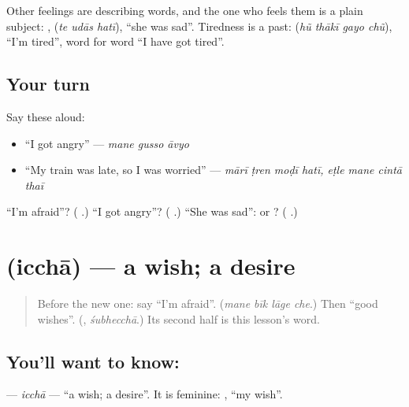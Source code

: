 Other feelings are describing words, and the one who feels them is a plain subject: \textbf{  }, \textbf{  } (\emph{te udās hatī}), \textquotedblleft{}she was sad\textquotedblright{}. Tiredness is a past: \textbf{   } (\emph{hũ thākī gayo chũ}), \textquotedblleft{}I'm tired\textquotedblright{}, word for word \textquotedblleft{}I have got tired\textquotedblright{}.

\subsection*{Your turn}
Say these aloud:

\begin{itemize}
\raggedright
  \item \textquotedblleft{}I got angry\textquotedblright{} — \emph{mane gusso āvyo}
  \item \textquotedblleft{}My train was late, so I was worried\textquotedblright{} — \emph{mārī ṭren moḍī hatī, eṭle mane cintā thaī}
\end{itemize}

\begin{tcolorbox}[breakable,colback=teal!4,colframe=teal!35!black,title={Before you move on}]
\textquotedblleft{}I'm afraid\textquotedblright{}? (\textbf{   }.) \textquotedblleft{}I got angry\textquotedblright{}? (\textbf{  }.) \textquotedblleft{}She was sad\textquotedblright{}: \textbf{} or \textbf{}? (\textbf{  }.)
\end{tcolorbox}
\section[\texorpdfstring{\gu{ઇચ્છા} (icchā)}{ઇચ્છા (icchā)}]{ (icchā) — a wish; a desire}

\label{lesson:GU-C281-iccha}



\begin{quote}
Before the new one: say \textquotedblleft{}I'm afraid\textquotedblright{}. (\emph{mane bīk lāge che}.) Then \textquotedblleft{}good wishes\textquotedblright{}. (\textbf{}, \emph{śubhecchā}.) Its second half is this lesson's word.
\end{quote}

\subsection*{You'll want to know: }
\textbf{} — \emph{icchā} — \textquotedblleft{}a wish; a desire\textquotedblright{}. It is feminine: \textbf{ }, \textquotedblleft{}my wish\textquotedblright{}.

